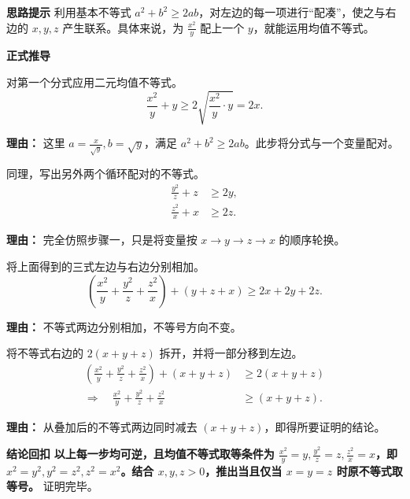 \begin{proofbox}
\textbf{\textcolor{CProof}{思路提示}}
利用基本不等式 $a^2+b^2 \geq 2ab$，对左边的每一项进行“配凑”，使之与右边的 $x, y, z$ 产生联系。具体来说，为 $\frac{x^2}{y}$ 配上一个 $y$，就能运用均值不等式。

\medskip
\textbf{\textcolor{CProof}{正式推导}}
\begin{description}[style=nextline, leftmargin=2.8em, labelsep=0.5em, itemsep=0.55em]
    \item[\textbf{步骤一（单项配凑）：}] 对第一个分式应用二元均值不等式。
    \[
        \frac{x^2}{y} + y \geq 2\sqrt{\frac{x^2}{y} \cdot y} = 2x.
    \]
    \par\textbf{理由：} 这里 $a=\frac{x}{\sqrt{y}}, b=\sqrt{y}$，满足 $a^2+b^2 \geq 2ab$。此步将分式与一个变量配对。

    \item[\textbf{步骤二（循环类推）：}] 同理，写出另外两个循环配对的不等式。
    \[
        \begin{aligned}
            \frac{y^2}{z} + z &\geq 2y, \\
            \frac{z^2}{x} + x &\geq 2z.
        \end{aligned}
    \]
    \par\textbf{理由：} 完全仿照步骤一，只是将变量按 $x\to y\to z\to x$ 的顺序轮换。

    \item[\textbf{步骤三（叠加求和）：}] 将上面得到的三式左边与右边分别相加。
    \[
        \left(\frac{x^2}{y} + \frac{y^2}{z} + \frac{z^2}{x}\right) + (y + z + x) \geq 2x + 2y + 2z.
    \]
    \par\textbf{理由：} 不等式两边分别相加，不等号方向不变。

    \item[\textbf{步骤四（移项化简）：}] 将不等式右边的 $2(x+y+z)$ 拆开，并将一部分移到左边。
    \[
        \begin{aligned}
        \left(\frac{x^2}{y} + \frac{y^2}{z} + \frac{z^2}{x}\right) + (x+y+z) &\geq 2(x+y+z) \\
        \Rightarrow \quad \frac{x^2}{y} + \frac{y^2}{z} + \frac{z^2}{x} &\geq (x+y+z).
        \end{aligned}
    \]
    \par\textbf{理由：} 从叠加后的不等式两边同时减去 $(x+y+z)$，即得所要证明的结论。
\end{description}

\medskip
\textbf{\textcolor{CProof}{结论回扣}}
\textbf{以上每一步均可逆，且均值不等式取等条件为 $\frac{x^2}{y}=y, \frac{y^2}{z}=z, \frac{z^2}{x}=x$，即 $x^2=y^2, y^2=z^2, z^2=x^2$。结合 $x,y,z>0$，推出当且仅当 $x=y=z$ 时原不等式取等号。} 证明完毕。
\end{proofbox}
